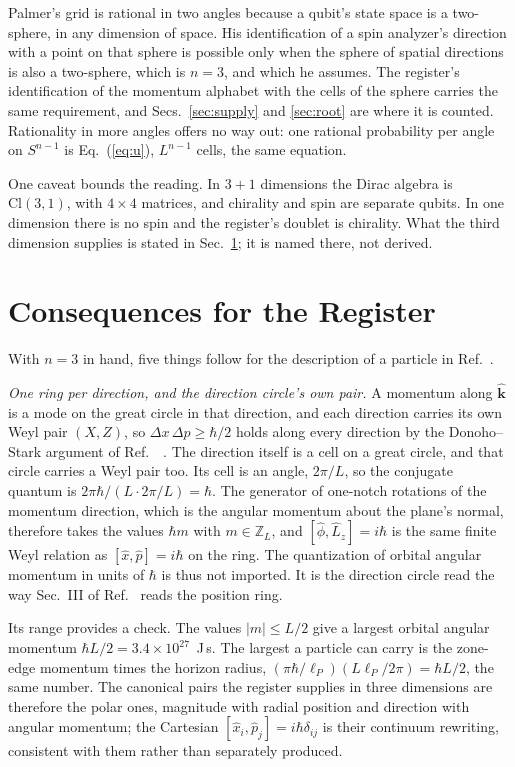 \documentclass[aps,prd,twocolumn,superscriptaddress,nofootinbib]{revtex4-2}
\begin{document}
Palmer's grid is rational in two angles because a qubit's state space is a two-sphere, in any dimension of space. His identification of a spin analyzer's direction with a point on that sphere is possible only when the sphere of spatial directions is also a two-sphere, which is $n = 3$, and which he assumes. The register's identification of the momentum alphabet with the cells of the sphere carries the same requirement, and Secs.~\ref{sec:supply} and \ref{sec:root} are where it is counted. Rationality in more angles offers no way out: one rational probability per angle on $S^{n-1}$ is Eq.~(\ref{eq:u}), $L^{n-1}$ cells, the same equation.

One caveat bounds the reading. In $3+1$ dimensions the Dirac algebra is $\mathrm{Cl}(3,1)$, with $4\times4$ matrices, and chirality and spin are separate qubits. In one dimension there is no spin and the register's doublet is chirality. What the third dimension supplies is stated in Sec.~\ref{sec:consequences}; it is named there, not derived.

\section{Consequences for the Register}
\label{sec:consequences}

With $n = 3$ in hand, five things follow for the description of a particle in Ref.~\cite{korytko2026c}.

\textit{One ring per direction, and the direction circle's own pair.} A momentum along $\hat{\mathbf{k}}$ is a mode on the great circle in that direction, and each direction carries its own Weyl pair $(X,Z)$, so $\Delta x\,\Delta p \ge \hbar/2$ holds along every direction by the Donoho--Stark argument of Ref.~\cite{korytko2026c}~\cite{donoho1989,massar2008}. The direction itself is a cell on a great circle, and that circle carries a Weyl pair too. Its cell is an angle, $2\pi/L$, so the conjugate quantum is $2\pi\hbar/(L\cdot2\pi/L) = \hbar$. The generator of one-notch rotations of the momentum direction, which is the angular momentum about the plane's normal, therefore takes the values $\hbar m$ with $m\in\mathbb{Z}_L$, and $[\hat\phi,\hat L_z] = i\hbar$ is the same finite Weyl relation as $[\hat x,\hat p] = i\hbar$ on the ring. The quantization of orbital angular momentum in units of $\hbar$ is thus not imported. It is the direction circle read the way Sec.~III of Ref.~\cite{korytko2026c} reads the position ring.

Its range provides a check. The values $|m| \le L/2$ give a largest orbital angular momentum $\hbar L/2 = 3.4\times10^{27}$~J\,s. The largest a particle can carry is the zone-edge momentum times the horizon radius, $(\pi\hbar/\ell_P)(L\ell_P/2\pi) = \hbar L/2$, the same number. The canonical pairs the register supplies in three dimensions are therefore the polar ones, magnitude with radial position and direction with angular momentum; the Cartesian $[\hat x_i,\hat p_j] = i\hbar\delta_{ij}$ is their continuum rewriting, consistent with them rather than separately produced.
\end{document}
